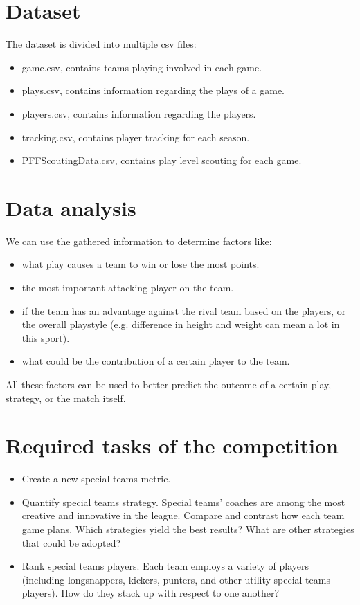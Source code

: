 \documentclass{article}
\begin{document}
\section{Dataset}
The dataset is divided into multiple csv files:
\begin{itemize}
\item game.csv, contains teams playing involved in each game.
\item plays.csv, contains  information regarding the plays of a game.
\item players.csv, contains information regarding the players.
\item tracking.csv, contains player tracking for each season.
\item PFFScoutingData.csv, contains play level scouting for each game.
\end{itemize}
\section{Data analysis}
We can use the gathered information to determine factors like:
\begin{itemize}
\item what play causes a team to win or lose the most points.
\item the most important attacking player on the team.
\item if the team has an advantage against the rival team based on the players, or the overall playstyle (e.g. difference in height and weight can mean a lot in this sport).
\item what could be the contribution of a certain player to the team.
\end{itemize}
All these factors can be used to better predict the outcome of a certain play, strategy, or the match itself.
\section{Required tasks of the competition}
\begin{itemize}
\item Create a new special teams metric.
\item Quantify special teams strategy. Special teams’ coaches are among the most creative and innovative in the league. Compare and contrast how each team game plans. Which strategies yield the best results? What are other strategies that could be adopted?
\item Rank special teams players. Each team employs a variety of players (including longsnappers, kickers, punters, and other utility special teams players). How do they stack up with respect to one another?
\end{itemize}
\end{document}
